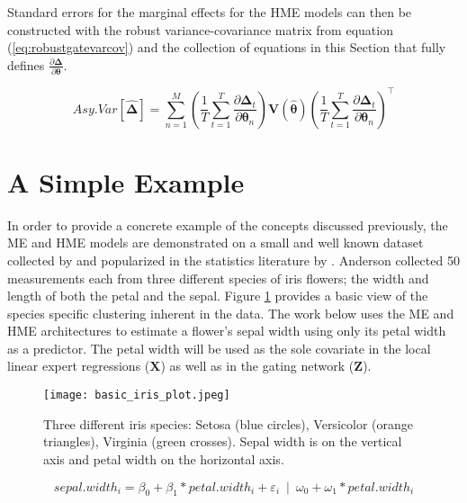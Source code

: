 \documentclass[12pt]{article}
\begin{document}
Standard errors for the marginal effects for the HME models can then be
constructed with the robust variance-covariance matrix from equation
(\ref{eq:robustgatevarcov}) and the collection of equations in this Section
that fully defines $\frac{\partial \boldsymbol{\Delta}}{\partial \boldsymbol{\theta}}$.


\begin{equation} \label{eq:std_errs_full_marginal_effects}
  Asy.Var \left[ \boldsymbol{ \hat{ \Delta } } \right] = \sum^{M}_{n=1}  \left( \frac{1}{T} \sum^{T}_{t=1} \frac{\partial \boldsymbol{\Delta}_{t}}{\partial \boldsymbol{\theta}_{n}} \right)     \boldsymbol{V}(\boldsymbol{\hat{\theta}})      \left( \frac{1}{T} \sum^{T}_{t=1} \frac{\partial \boldsymbol{\Delta}_{t}}{\partial \boldsymbol{\theta}_{n}} \right)^\top
\end{equation} 

\section{A Simple Example} \label{sec:SimpleExample}

In order to provide a concrete example of the concepts discussed previously,
the ME and HME models are demonstrated on a small and well known dataset
collected by \citet{Anderson1936} and popularized in the
statistics literature by \citet{Fisher1936}. Anderson collected
50 measurements each from three different species of iris flowers; the width and
length of both the petal and the sepal. Figure \ref{fig:Iris_dataset} provides a
basic view of the species specific clustering inherent in the data.
The work below uses the ME and HME architectures to estimate a flower's sepal
width using only its petal width as a predictor. The petal width will be used
as the sole covariate in the local linear expert regressions ($\boldsymbol{X}$) as well as
in the gating network ($\boldsymbol{Z}$). 

\begin{figure}[!ht]
  \texttt{[image: basic\_iris\_plot.jpeg]}
  \caption{Three different iris species: Setosa
  (blue circles), Versicolor (orange triangles), Virginia (green crosses).
  Sepal width is on the vertical axis and petal width on the horizontal
  axis.}
  \label{fig:Iris_dataset}
\end{figure}



\begin{equation} \label{eq:HME_iris}
    sepal.width_{i} = \beta_{0} + \beta_{1} * petal.width_{i} + \varepsilon_{i} \enspace | \enspace \omega_{0} + \omega_{1} * petal.width_{i}
\end{equation}
\end{document}
